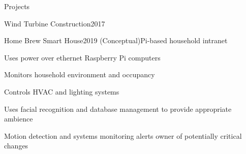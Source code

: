 \documentclass{resume} %
\begin{document}
\begin{rSection}{Projects}

\begin{rWorkSubsection}{Wind Turbine Construction}{2017}{}{}
\item 
\end{rWorkSubsection}\vspace{-0.5em}


\begin{rWorkSubsection}{Home Brew Smart House}{2019 (Conceptual)}{Pi-based household intranet}{}
\item Uses power over ethernet Raspberry Pi computers
\item Monitors household environment and occupancy
\item Controls HVAC and lighting systems
\item Uses facial recognition and database management to provide appropriate ambience
\item Motion detection and systems monitoring alerts owner of potentially critical changes
\end{rWorkSubsection}\vspace{-0.5em}
\fi

\end{rSection}

\end{document}
